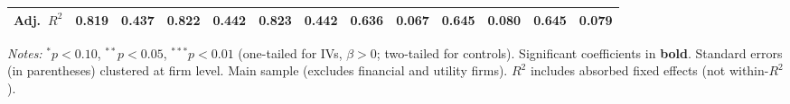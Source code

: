 \begin{landscape}
\begin{table}[H]
\begin{tabular}{lcccccccccccc}
Adj.~$R^2$ & 0.819 & 0.437 & 0.822 & 0.442 & 0.823 & 0.442 & 0.636 & 0.067 & 0.645 & 0.080 & 0.645 & 0.079 \\
\bottomrule
\end{tabular}
\begin{minipage}{\linewidth}
\vspace{2pt}\scriptsize
\textit{Notes:} $^{*}p<0.10$, $^{**}p<0.05$, $^{***}p<0.01$ (one-tailed for IVs, $\beta > 0$; two-tailed for controls).
 Significant coefficients in \textbf{bold}.
 Standard errors (in parentheses) clustered at firm level.
 Main sample (excludes financial and utility firms).
 $R^2$ includes absorbed fixed effects (not within-$R^2$).
\end{minipage}
\end{table}
\end{landscape}